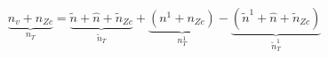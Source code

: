 \documentclass[12pt]{article}
\begin{document}
\begin{displaymath}
\underbrace{n_v+n_{Zc}}_{n_T}= 
\underbrace{\tilde{n}+\hat{n}+\tilde{n}_{Zc}}_{\tilde{n}_T}+
\underbrace{(n^1+n_{Zc})}_{n^1_T}-
\underbrace{(\tilde{n}^1+\hat{n}+\tilde{n}_{Zc})}_{\tilde{n}^1_T}
\end{displaymath}
\end{document}
